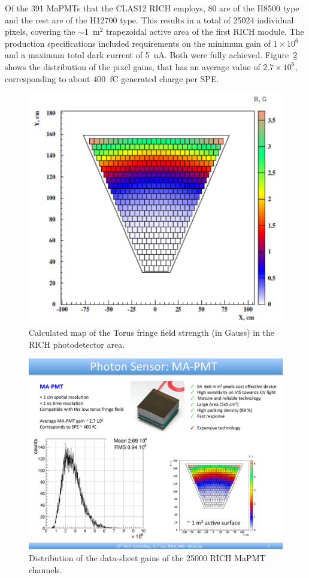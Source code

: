 \documentclass[5p,times,twocolumn]{elsarticle}
\begin{document}
Of the 391 MaPMTs that the CLAS12 RICH employs, 80 are of the H8500 type and the rest are of the H12700 type.
This results in a total of 25024 individual pixels, covering the $\sim$1~m$^2$ trapezoidal active area of the first
RICH module.
The production specifications included requirements on the minimum gain of $1 \times 10^6$ and a maximum total dark
current of 5~nA. Both were fully achieved. Figure~\ref{fig:MaPMTGain} shows the distribution of the pixel gains, that
has an average value of $2.7 \times 10^6$, corresponding to about 400~fC generated charge per SPE.

\begin{figure}[t]
\begin{center}
\includegraphics[width=0.70\columnwidth]{Field.pdf}
\end{center}
\caption{Calculated map of the Torus fringe field strength (in Gauss) in the RICH photodetector area.}
\label{fig:MagFringe}
\end{figure}

\begin{figure}[t]
\begin{center}
\includegraphics[width=0.65\columnwidth]{Gain.pdf}
\end{center}
\caption{Distribution of the data-sheet gains of the 25000 RICH MaPMT channels.}
\label{fig:MaPMTGain}
\end{figure}
\end{document}
